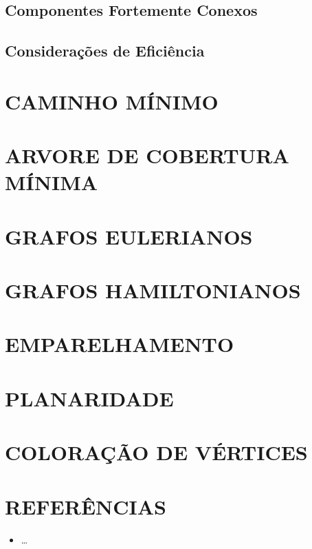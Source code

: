 \documentclass[
12pt,
a4paper,
semrecuonosumario,
sumario = abnt-6027-2012]{report}
\begin{document}
	\section{Componentes Fortemente Conexos}\label{sec:compFC}
	
	\section{Considerações de Eficiência}\label{sec:eficienciaBusca}
	
	\chapter{CAMINHO MÍNIMO}\label{cap:caminhoMinimo}
	
	
	\chapter{ARVORE DE COBERTURA MÍNIMA}\label{cap:arvCobMinima}

	
	\chapter{GRAFOS EULERIANOS}\label{cap:grafosEulerianos}
	
	
	\chapter{GRAFOS HAMILTONIANOS}\label{cap:grafosHamiltonianos}
	
	
	\chapter{EMPARELHAMENTO}\label{cap:emparelhamento}

	
	\chapter{PLANARIDADE}\label{cap:planaridade}

	
	\chapter{COLORAÇÃO DE VÉRTICES}\label{cap:coloracaoVertices}

	
	\clearpage
	\chapter*{REFERÊNCIAS}
	\vspace{-0.5em}
	\begin{itemize}
		\item \dots
	\end{itemize}
	
\end{document}
